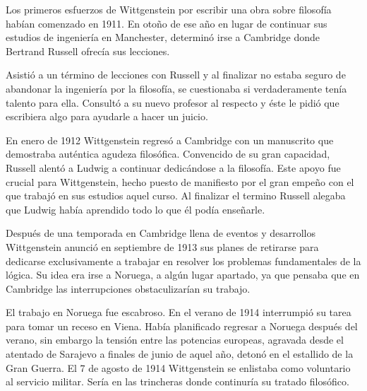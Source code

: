 Los primeros esfuerzos de Wittgenstein por escribir una obra sobre filosofía
habían comenzado en 1911. En otoño de ese año en lugar de continuar sus estudios
de ingeniería en Manchester, determinó irse a Cambridge donde Bertrand Russell
ofrecía sus lecciones.

Asistió a un término de lecciones con Russell y al finalizar no estaba seguro de
abandonar la ingeniería por la filosofía, se cuestionaba si verdaderamente tenía
talento para ella. Consultó a su nuevo profesor al respecto y éste le pidió que
escribiera algo para ayudarle a hacer un juicio.

En enero de 1912 Wittgenstein regresó a Cambridge con un manuscrito que
demostraba auténtica agudeza filosófica. Convencido de su gran capacidad,
Russell alentó a Ludwig a continuar dedicándose a la filosofía. Este apoyo fue
crucial para Wittgenstein, hecho puesto de manifiesto por el gran empeño con el
que trabajó en sus estudios aquel curso. Al finalizar el termino Russell alegaba
que Ludwig había aprendido todo lo que él podía enseñarle.\autocite[cap. 3 loc
865]{monk1991duty}

Después de una temporada en Cambridge llena de eventos y desarrollos
Wittgenstein anunció en septiembre de 1913 sus planes de retirarse para
dedicarse exclusivamente a trabajar en resolver los problemas fundamentales de
la lógica. Su idea era irse a Noruega, a algún lugar apartado, ya que pensaba
que en Cambridge las interrupciones obstaculizarían su trabajo.\autocite[cap. 4
loc 1844]{monk1991duty}


El trabajo en Noruega fue escabroso. En el verano de 1914 interrumpió su tarea
para tomar un receso en Viena.\autocite[cap. 5 loc 2154]{monk1991duty} Había planificado
regresar a Noruega después del verano, sin embargo la tensión entre las
potencias europeas, agravada desde el atentado de Sarajevo a finales de junio de
aquel año, detonó en el estallido de la Gran Guerra. El 7 de agosto de 1914
Wittgenstein se enlistaba como voluntario al servicio militar. Sería en las
trincheras donde continuría su tratado filosófico.

